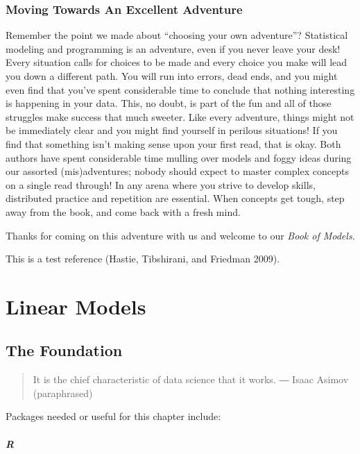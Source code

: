 \documentclass[
  letterpaper,
]{krantz}
\begin{document}
\section{Moving Towards An Excellent
Adventure}\label{moving-towards-an-excellent-adventure}

Remember the point we made about ``choosing your own adventure''?
Statistical modeling and programming is an adventure, even if you never
leave your desk! Every situation calls for choices to be made and every
choice you make will lead you down a different path. You will run into
errors, dead ends, and you might even find that you've spent
considerable time to conclude that nothing interesting is happening in
your data. This, no doubt, is part of the fun and all of those struggles
make success that much sweeter. Like every adventure, things might not
be immediately clear and you might find yourself in perilous situations!
If you find that something isn't making sense upon your first read, that
is okay. Both authors have spent considerable time mulling over models
and foggy ideas during our assorted (mis)adventures; nobody should
expect to master complex concepts on a single read through! In any arena
where you strive to develop skills, distributed practice and repetition
are essential. When concepts get tough, step away from the book, and
come back with a fresh mind.

Thanks for coming on this adventure with us and welcome to our
\emph{Book of Models}.

This is a test reference (Hastie, Tibshirani, and Friedman 2009).

\part{Linear Models}

\chapter{The Foundation}\label{the-foundation}

\begin{quote}
It is the chief characteristic of data science that it works. ― Isaac
Asimov (paraphrased)
\end{quote}

Packages needed or useful for this chapter include:

\subsubsection{R}
\end{document}
